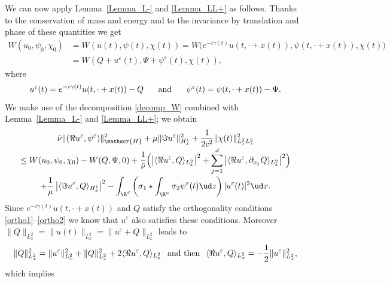We can now apply Lemma~\ref{Lemma_L-} and \ref{Lemma_LL+} as follows. Thanks to the conservation of mass and energy and
to the invariance by translation and phase of these quantities we get\vspace*{-3pt}
\begin{align*}
W(u_{0},\psi_{0},\chi_{0})&=W(u(t),\psi(t),\chi(t))
=W\bigl(e^{-i\gamma(t)}u(t,\cdot+x(t)),\psi(t,\cdot+x(t)),\chi(t)\bigr)\\
&=W(Q+u^{\varepsilon}(t),\Psi+\psi^{\varepsilon}(t),\chi(t)),
\end{align*}
where\vspace*{-5pt}
\[
u^{\varepsilon}(t)=e^{-i\gamma(t)}u(t,\cdot+x(t))-Q\hspace{0.5cm}\text{ and }\hspace{0.5cm}\psi^{\varepsilon}(t)=\psi(t,\cdot+x(t))-\Psi.
\]
We make use of the decomposition \eqref{decomp_W} combined with Lemma~\ref{Lemma_L-} and \ref{Lemma_LL+}; we obtain\vspace*{-5pt}
\begin{multline*}
\bar{\nu}\|(\Re u^{\varepsilon},\psi^{\varepsilon})\|_{\mathscr{H}}^{2}+\mu\|\Im u^{\varepsilon}\|_{H_{x}^{1}}^{2}+\frac{1}{2c^{2}}\|\chi(t)\|_{L_{x}^{2}L_{z}^{2}}^{2}\\[
-3pt]
\leq W(u_{0},\psi_{0},\chi_{0})-W(Q,\Psi,0)+\frac{1}{\bar{\nu}}\Bigl(\left|\langle \Re u^{\varepsilon},Q\rangle_{L_{x}^{2}}\right|^{2}+\sum_{j=1}^{d}\left|\langle \Re u^{\varepsilon},\partial_{x_{j}}Q\rangle_{L_{x}^{2}}\right|^{2}\Bigr)\\[
-2pt]
+\frac{1}{\mu}\left|\langle \Im u^{\varepsilon},Q\rangle_{H_{x}^{1}}\right|^{2}-\int_{\R^{d}}\left(\sigma_{1}\star\int_{\R^{n}}\sigma_{2}\psi^{\varepsilon}(t)\ud z\right)|u^{\varepsilon}(t)|^{2}\ud x.
\end{multline*}
Since $e^{-i\gamma(t)}u(t,\cdot+x(t))$ and $Q$ satisfy the orthogonality conditions \eqref{ortho1}--\eqref{ortho2} we know that $u^{\varepsilon}$ also satisfies these conditions. Moreover $\|Q\|_{L_{x}^{2}}=\|u(t)\|_{L_{x}^{2}}=\|u^{\varepsilon}+Q\|_{L_{x}^{2}}$ leads to\vspace*{-3pt}
\[
\|Q\|_{L_{x}^{2}}^{2}=\|u^{\varepsilon}\|_{L_{x}^{2}}^{2}+\|Q\|_{L_{x}^{2}}^{2}+2\langle\Re u^{\varepsilon},Q\rangle_{L_{x}^{2}} \hspace{0.25cm}\text{and then}\hspace{0.25cm} \langle\Re u^{\varepsilon},Q\rangle_{L_{x}^{2}}=-\frac{1}{2}\|u^{\varepsilon}\|_{L_{x}^{2}}^{2},
\]
which implies\vspace*{-3pt}

